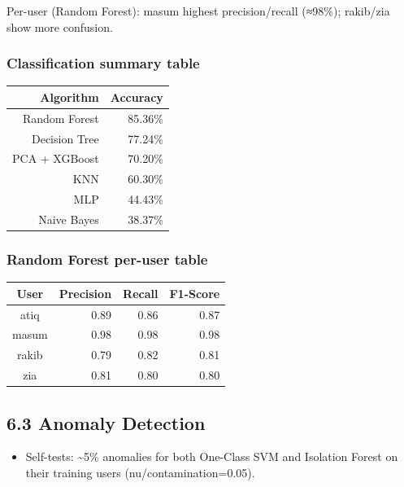 \documentclass[
  11pt,
  a4paper,
]{article}
\providecommand{\tightlist}{%
  \setlength{\itemsep}{0pt}\setlength{\parskip}{0pt}}
\begin{document}
Per-user (Random Forest): masum highest precision/recall (≈98\%);
rakib/zia show more confusion.

\subsubsection{Classification summary
table}\label{classification-summary-table}

\begin{longtable}[]{@{}rr@{}}
\toprule\noalign{}
Algorithm & Accuracy \\
\midrule\noalign{}
\endhead
\bottomrule\noalign{}
\endlastfoot
Random Forest & 85.36\% \\
Decision Tree & 77.24\% \\
PCA + XGBoost & 70.20\% \\
KNN & 60.30\% \\
MLP & 44.43\% \\
Naive Bayes & 38.37\% \\
\end{longtable}

\subsubsection{Random Forest per-user
table}\label{random-forest-per-user-table}

\begin{longtable}[]{@{}crrr@{}}
\toprule\noalign{}
User & Precision & Recall & F1-Score \\
\midrule\noalign{}
\endhead
\bottomrule\noalign{}
\endlastfoot
atiq & 0.89 & 0.86 & 0.87 \\
masum & 0.98 & 0.98 & 0.98 \\
rakib & 0.79 & 0.82 & 0.81 \\
zia & 0.81 & 0.80 & 0.80 \\
\end{longtable}

\subsection{6.3 Anomaly Detection}\label{anomaly-detection}

\begin{itemize}
\tightlist
\item
  Self-tests: \textasciitilde5\% anomalies for both One-Class SVM and
  Isolation Forest on their training users (nu/contamination=0.05).
\end{itemize}
\end{document}
